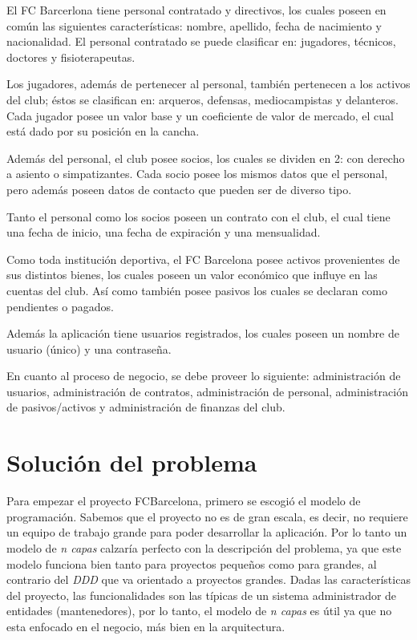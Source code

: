 \documentclass[letter]{article}
\begin{document}
El FC Barcerlona tiene personal contratado y directivos, los cuales poseen en común las siguientes características: nombre, apellido, fecha de nacimiento y nacionalidad. El personal contratado se puede clasificar en: jugadores, técnicos, doctores y fisioterapeutas. 

Los jugadores, además de pertenecer al personal, también pertenecen a los activos del club; éstos se clasifican en: arqueros, defensas, mediocampistas y delanteros. Cada jugador posee un valor base y un coeficiente de valor de mercado, el cual está dado por su posición en la cancha.

Además del personal, el club posee socios, los cuales se dividen en 2: con derecho a asiento o simpatizantes. Cada socio posee los mismos datos que el personal, pero además poseen datos de contacto que pueden ser de diverso tipo.

Tanto el personal como los socios poseen un contrato con el club, el cual tiene una fecha de inicio, una fecha de expiración y una mensualidad.

Como toda institución deportiva, el FC Barcelona posee activos provenientes de sus distintos bienes, los cuales poseen un valor económico que influye en las cuentas del club. Así como también posee pasivos los cuales se declaran como pendientes o pagados.

Además la aplicación tiene usuarios registrados, los cuales poseen un nombre de usuario (único) y una contraseña.

En cuanto al proceso de negocio, se debe proveer lo siguiente: administración de usuarios, administración de contratos, administración de personal, administración de pasivos/activos y administración de finanzas del club.


\newpage
\section{Solución del problema}
 Para empezar el proyecto FCBarcelona, primero se escogió el modelo de programación. Sabemos que el proyecto no es de gran escala, es decir, no requiere un equipo de trabajo grande para poder desarrollar la aplicación. Por lo tanto un modelo de \textit{n capas} calzaría perfecto con la descripción del problema, ya que este modelo funciona bien tanto para proyectos pequeños como para grandes, al contrario del \textit{DDD} que va orientado a  proyectos grandes. Dadas las características del proyecto, las funcionalidades son las típicas
de un sistema administrador de entidades (mantenedores), por lo tanto, el modelo de \textit{n capas} es útil ya que no esta enfocado en el negocio, más bien en la arquitectura.
\end{document}
